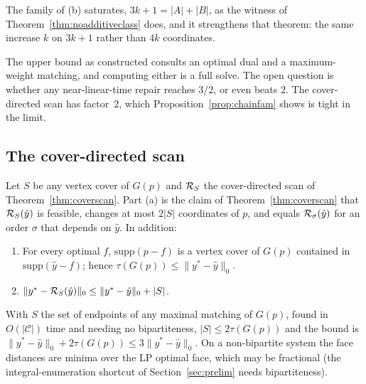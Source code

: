 The family of (b) saturates, $3k + 1 = |A| + |B|$, as the witness of
Theorem~\ref{thm:noadditiveclass} does, and it strengthens that theorem: the same increase
$k$ on $3k+1$ rather than $4k$ coordinates.

The upper bound as constructed consults an optimal dual and a maximum-weight matching, and
computing either is a full solve. The open question is whether any near-linear-time repair reaches
$3/2$, or even beats $2$. The cover-directed scan has factor~$2$, which
Proposition~\ref{prop:chainfam} shows is tight in the limit.

\subsection{The cover-directed scan}

\begin{remark}\label{rem:coverscanfull}
Let $S$ be any vertex cover of $G(p)$ and $\mathcal{R}_S$ the cover-directed scan of
Theorem~\ref{thm:coverscan}. Part (a) is the claim of Theorem~\ref{thm:coverscan} that $\mathcal{R}_S(\hat y)$ is feasible,
changes at most $2|S|$ coordinates of $p$, and equals $\mathcal{R}_\sigma(\hat y)$ for an order
$\sigma$ that depends on $\hat y$. In addition:
\begin{enumerate}
\item[(b)] For every optimal $f$, $\mathrm{supp}(p - f)$ is a vertex cover of $G(p)$ contained in $\mathrm{supp}(\hat y - f)$; hence $\tau(G(p)) \le \|y^* - \hat y\|_0$.
\item[(c)] $\|y^* - \mathcal{R}_S(\hat y)\|_0 \le \|y^* - \hat y\|_0 + |S|$.
\end{enumerate}
With $S$ the set of endpoints of any maximal matching of $G(p)$, found in $O(|\mathcal{C}|)$ time and needing no bipartiteness, $|S| \le 2\tau(G(p))$ and the bound is $\|y^* - \hat y\|_0 + 2\tau(G(p)) \le 3\|y^* - \hat y\|_0$. On a non-bipartite system the face distances are minima over the LP optimal face, which may be fractional (the integral-enumeration shortcut of Section~\ref{sec:prelim} needs bipartiteness).
\end{remark}

